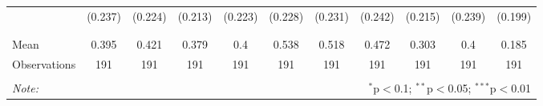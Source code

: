 \begin{tabular}{@{\extracolsep{5pt}}lcccccccccc}
  & (0.237) & (0.224) & (0.213) & (0.223) & (0.228) & (0.231) & (0.242) & (0.215) & (0.239) & (0.199) \\ 
  & & & & & & & & & & \\ 
\hline \\[-1.8ex] 
Mean & 0.395 & 0.421 & 0.379 & 0.4 & 0.538 & 0.518 & 0.472 & 0.303 & 0.4 & 0.185 \\ 
Observations & 191 & 191 & 191 & 191 & 191 & 191 & 191 & 191 & 191 & 191 \\ 
\hline 
\hline \\[-1.8ex] 
\textit{Note:}  & \multicolumn{10}{r}{$^{*}$p$<$0.1; $^{**}$p$<$0.05; $^{***}$p$<$0.01} \\ 
\end{tabular} 

